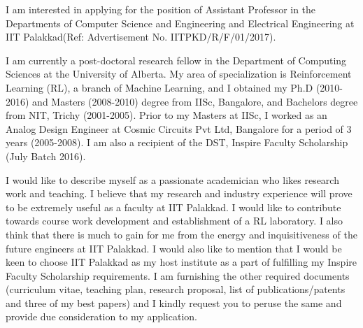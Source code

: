 \documentclass[10pt,stdletter,dateno,sigleft]{newlfm} %
\begin{document}
\begin{newlfm}


I am interested in applying for the position of Assistant Professor in the Departments of Computer Science and Engineering and Electrical Engineering at IIT Palakkad(Ref: Advertisement No. IITPKD/R/F/01/2017).

I am currently a post-doctoral research fellow in the Department of Computing Sciences at the University of Alberta. My area of specialization is Reinforcement Learning (RL), a branch of Machine Learning, and I obtained my Ph.D (2010-2016) and Masters (2008-2010) degree from IISc, Bangalore, and Bachelors degree from NIT, Trichy (2001-2005). Prior to my Masters at IISc, I worked as an Analog Design Engineer at Cosmic Circuits Pvt Ltd, Bangalore for a period of 3 years (2005-2008). I am also a recipient of the DST, Inspire Faculty Scholarship (July Batch 2016).

I would like to describe myself as a passionate academician who likes research work and teaching. I believe that my research and industry experience will prove to be extremely useful as a faculty at IIT Palakkad. I would like to contribute towards course work development and establishment of a RL laboratory. I also think that there is much to gain for me from the energy and inquisitiveness of the future engineers at IIT Palakkad. I would also like to mention that I would be keen to choose IIT Palakkad as my host institute as a part of fulfilling my Inspire Faculty Scholarship requirements. I am furnishing the other required documents (curriculum vitae, teaching plan, research proposal, list of publications/patents and three of my best papers) and I kindly request you to peruse the same and provide due consideration to my application.

\end{newlfm}
\end{document}
